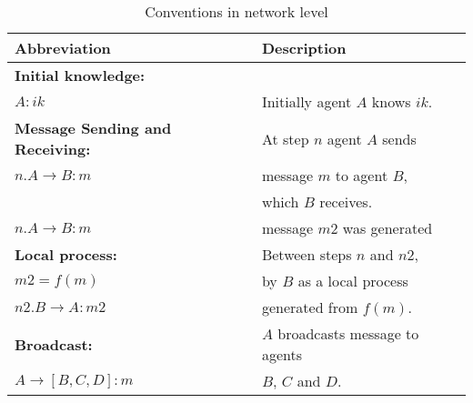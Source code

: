 \begin{table}[htb]
\footnotesize
\begin{center}
\caption{Conventions in network level}
\label{table:NetConventions}
\begin{tabular}{|l|l|}
\hline
{\bf Abbreviation}                      & {\bf Description}                    \\\hline\hline
\textbf{Initial knowledge:}             &                                      \\
$A : ik$                                &  Initially agent $A$ knows $ik$.    \\ \hline 
\textbf{Message Sending and Receiving:} &  At step $n$ agent $A$ sends         \\ 
$n. A \rightarrow B: m$                 &  message $m$ to agent $B$,\\
                                        &  which $B$ receives.      \\ \hline 
$n. A\rightarrow B: m$                  &  message $m2$ was generated \\ 
\hspace{5mm}\textbf{Local process:}     &  Between steps $n$ and $n2$,    \\ 
\hspace{5mm}$m2 = f(m)$                 &  by $B$ as a local process \\ 
$n2. B\rightarrow A: m2$                &  generated from $f(m)$.     \\ \hline 
\textbf{Broadcast:}                     &  $A$ broadcasts message to agents\\ 
$A \rightarrow [B, C, D]: m$            &  $B$, $C$ and $D$.\\ \hline \hline 
\end{tabular}
\end{center}
\end{table}
\normalsize
